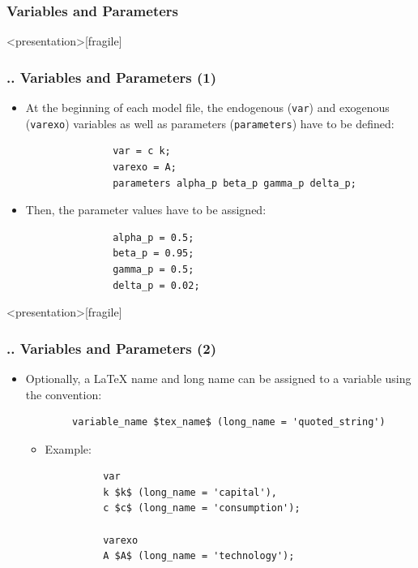 \documentclass[11pt,aspectratio=169]{beamer}
\begin{document}
\subsubsection{Variables and Parameters}
\begin{frame}<presentation>[fragile]
	\frametitle{{\thesection.\thesubsection.\thesubsubsection} Variables and Parameters (1)}
	\begin{itemize}
		\item At the beginning of each model file, the endogenous (\texttt{var}) and exogenous (\texttt{varexo}) variables as well as parameters (\texttt{parameters}) have to be defined:
			\begin{verbatim}
			   var = c k;		
			   varexo = A;		
			   parameters alpha_p beta_p gamma_p delta_p;	
			\end{verbatim}	
		\item Then, the parameter values have to be assigned:
			\begin{verbatim}				
			   alpha_p = 0.5;
			   beta_p = 0.95;
			   gamma_p = 0.5;
			   delta_p = 0.02;
			\end{verbatim}
	\end{itemize}
\end{frame}
\begin{frame}<presentation>[fragile]
	\frametitle{{\thesection.\thesubsection.\thesubsubsection} Variables and Parameters (2)}
	\begin{itemize}
		\item Optionally, a LaTeX name and long name can be assigned to a variable using the convention:\\ 
		\begin{verbatim}
		variable_name $tex_name$ (long_name = 'quoted_string') \end{verbatim}
		\begin{itemize}
			\item Example:
		\begin{verbatim}
		  var 
		  k $k$ (long_name = 'capital'),
		  c $c$ (long_name = 'consumption');
		  
		  varexo 
		  A $A$ (long_name = 'technology');
		\end{verbatim}
		\end{itemize}
	\end{itemize}
\end{frame}
\end{document}
